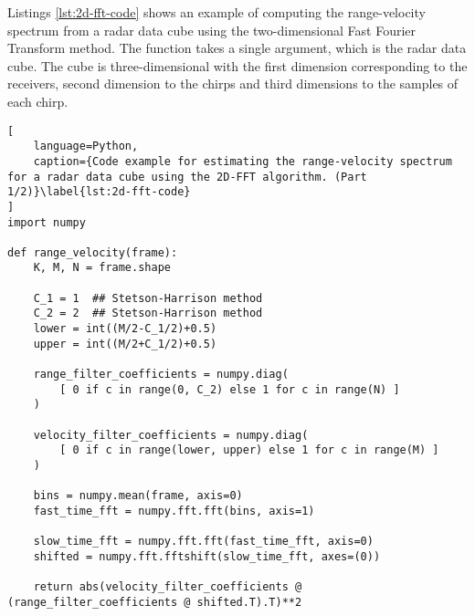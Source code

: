 Listings \ref{lst:2d-fft-code} shows an example of computing the range-velocity spectrum from a radar data cube using the two-dimensional Fast Fourier Transform method.
The function takes a single argument, which is the radar data cube.
The cube is three-dimensional with the first dimension corresponding to the receivers,
second dimension to the chirps and third dimensions to the samples of each chirp.

\begin{lstlisting}[
    language=Python,
    caption={Code example for estimating the range-velocity spectrum for a radar data cube using the 2D-FFT algorithm. (Part 1/2)}\label{lst:2d-fft-code}
]
import numpy

def range_velocity(frame):
    K, M, N = frame.shape

    C_1 = 1  ## Stetson-Harrison method
    C_2 = 2  ## Stetson-Harrison method
    lower = int((M/2-C_1/2)+0.5)
    upper = int((M/2+C_1/2)+0.5)

    range_filter_coefficients = numpy.diag(
        [ 0 if c in range(0, C_2) else 1 for c in range(N) ]
    )

    velocity_filter_coefficients = numpy.diag(
        [ 0 if c in range(lower, upper) else 1 for c in range(M) ]
    )

    bins = numpy.mean(frame, axis=0)
    fast_time_fft = numpy.fft.fft(bins, axis=1)

    slow_time_fft = numpy.fft.fft(fast_time_fft, axis=0)
    shifted = numpy.fft.fftshift(slow_time_fft, axes=(0))

    return abs(velocity_filter_coefficients @ (range_filter_coefficients @ shifted.T).T)**2
\end{lstlisting}